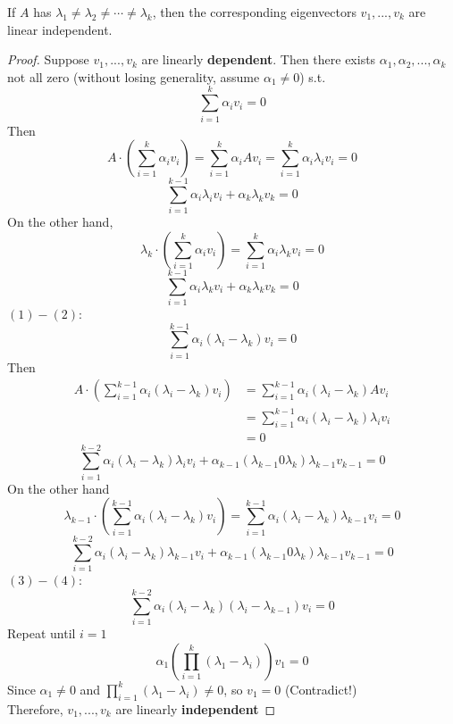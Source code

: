 \begin{multicols}{2}
If $A$ has $\lambda_1\neq\lambda_2\neq\cdots\neq\lambda_k$, then the corresponding eigenvectors $v_1,...,v_k$ are linear independent. \\
\begin{proof}
    \par Suppose $v_1,...,v_k$ are linearly \textbf{dependent}. Then there exists $\alpha_1,\alpha_2,...,\alpha_k$ not all zero 
    (without losing generality, assume $\alpha_1\neq 0$) s.t. 
    \[
        \sum_{i=1}^k \alpha_i v_i = 0
    \]
    Then
    \[
        A\cdot \left(\sum_{i=1}^k \alpha_i v_i\right) = \sum_{i=1}^k \alpha_i A v_i = \sum_{i=1}^k \alpha_i \lambda_i v_i = 0
    \]
    \begin{equation}
        \sum_{i=1}^{k-1} \alpha_i \lambda_i v_i + \alpha_k \lambda_k v_k = 0 \tag{1}
    \end{equation}
    On the other hand,
    \[
        \lambda_k\cdot \left(\sum_{i=1}^k \alpha_i v_i\right) = \sum_{i=1}^{k} \alpha_i \lambda_k v_i = 0
    \]
    \begin{equation}
        \sum_{i=1}^{k-1} \alpha_i \lambda_k v_i + \alpha_k \lambda_k v_k = 0 \tag{2}
    \end{equation}
    $(1)-(2)$:
    \[
        \sum_{i=1}^{k-1} \alpha_i (\lambda_i - \lambda_k) v_i = 0
    \]
    Then
    \[
        \begin{array}{rl}
            A\cdot \left(\sum_{i=1}^{k-1} \alpha_i (\lambda_i - \lambda_k) v_i\right)&=\sum_{i=1}^{k-1} \alpha_i (\lambda_i - \lambda_k) Av_i \\
            &=\sum_{i=1}^{k-1} \alpha_i (\lambda_i - \lambda_k) \lambda_i v_i \\
            & = 0
        \end{array}
    \]
    \begin{equation}
        \sum_{i=1}^{k-2} \alpha_i (\lambda_i - \lambda_k) \lambda_i v_i + \alpha_{k-1}(\lambda_{k-1}0\lambda_k)\lambda_{k-1}v_{k-1}=0 \tag{3}
    \end{equation}
    On the other hand
    \[
        \lambda_{k-1}\cdot \left(\sum_{i=1}^{k-1} \alpha_i (\lambda_i - \lambda_k) v_i\right)=\sum_{i=1}^{k-1} \alpha_i (\lambda_i - \lambda_k)\lambda_{k-1}v_i =0 
    \]
    \begin{equation}
        \sum_{i=1}^{k-2} \alpha_i (\lambda_i - \lambda_k) \lambda_{k-1} v_i + \alpha_{k-1}(\lambda_{k-1}0\lambda_k)\lambda_{k-1}v_{k-1}=0 \tag{4}
    \end{equation}
    $(3)-(4)$:
    \[
        \sum_{i=1}^{k-2} \alpha_i (\lambda_i - \lambda_k)(\lambda_i - \lambda_{k-1}) v_i = 0
    \]
    Repeat until $i=1$
    \[
        \alpha_1\left(\prod_{i=1}^k(\lambda_1 - \lambda_i)\right)v_1 = 0
    \]
    Since $\alpha_1\neq 0$ and $\prod_{i=1}^k(\lambda_1 - \lambda_i)\neq 0$, so $v_1 = 0$ (Contradict!) \\
    Therefore, $v_1,...,v_k$ are linearly \textbf{independent}
\end{proof}


\end{multicols}
